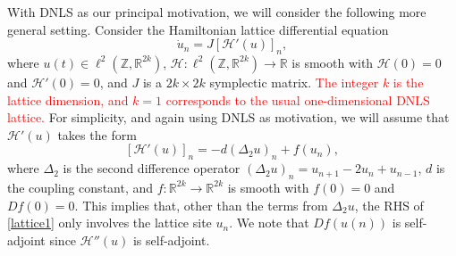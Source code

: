 \documentclass[12pt]{elsarticle}
\def\R{{\mathbb R}}
\def\Z{{\mathbb Z}}
\newcommand{\revised}[1]{ \textcolor{red}{#1} }
\begin{document}
With DNLS as our principal motivation, we will consider the following more general setting. Consider the Hamiltonian lattice differential equation 
\begin{equation}\label{lattice1}
\dot{u}_n = J [\mathcal{H}'(u)]_n,
\end{equation}
where $u(t) \in \ell^2(\Z, \R^{2k})$, $\mathcal{H}: \ell^2(\Z, \R^{2k}) \rightarrow \R$ is smooth with $\mathcal{H}(0) = 0$ and $\mathcal{H}'(0) = 0$, and $J$ is a $2k \times 2k$ symplectic matrix. \revised{ The integer $k$ is the lattice dimension, and $k = 1$ corresponds to the usual one-dimensional DNLS lattice.} For simplicity, and again using DNLS as motivation, we will assume that $\mathcal{H}'(u)$ takes the form
\begin{equation}\label{latticeform}
[\mathcal{H}'(u)]_n = -d (\Delta_2 u)_n + f(u_n),
\end{equation}
where $\Delta_2$ is the second difference operator $(\Delta_2 u)_n = u_{n+1} - 2 u_n + u_{n-1}$, $d$ is the coupling constant, and $f: \R^{2k} \rightarrow \R^{2k}$ is smooth with $f(0) = 0$ and $Df(0) = 0$. This implies that, other than the terms from $\Delta_2 u$, the RHS of \cref{lattice1} only involves the lattice site $u_n$. We note that $Df(u(n))$ is self-adjoint since $\mathcal{H}''(u)$ is self-adjoint.
\end{document}
